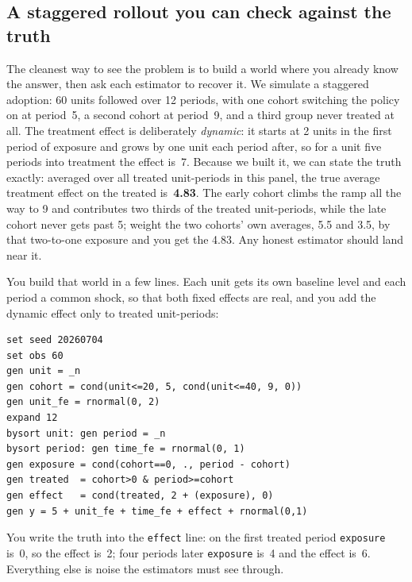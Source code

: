 \documentclass[
    a4paper,
    fontsize=10pt,
    twoside=true,
    numbers=noenddot,
]{kaobook}
\begin{document}
\subsection{A staggered rollout you can check against the truth}
The cleanest way to see the problem is to build a world where you already know the answer, then ask each estimator to recover it. We simulate a staggered adoption: 60 units followed over 12 periods, with one cohort switching the policy on at period~5, a second cohort at period~9, and a third group never treated at all. The treatment effect is deliberately \emph{dynamic}: it starts at 2 units in the first period of exposure and grows by one unit each period after, so for a unit five periods into treatment the effect is~7. Because we built it, we can state the truth exactly: averaged over all treated unit-periods in this panel, the true average treatment effect on the treated is~\textbf{4.83}. The early cohort climbs the ramp all the way to 9 and contributes two thirds of the treated unit-periods, while the late cohort never gets past 5; weight the two cohorts' own averages, 5.5 and 3.5, by that two-to-one exposure and you get the 4.83. Any honest estimator should land near it.

You build that world in a few lines. Each unit gets its own baseline level and each period a common shock, so that both fixed effects are real, and you add the dynamic effect only to treated unit-periods:
\par
{\footnotesize
\begin{verbatim}
set seed 20260704
set obs 60
gen unit = _n
gen cohort = cond(unit<=20, 5, cond(unit<=40, 9, 0))
gen unit_fe = rnormal(0, 2)
expand 12
bysort unit: gen period = _n
bysort period: gen time_fe = rnormal(0, 1)
gen exposure = cond(cohort==0, ., period - cohort)
gen treated  = cohort>0 & period>=cohort
gen effect   = cond(treated, 2 + (exposure), 0)
gen y = 5 + unit_fe + time_fe + effect + rnormal(0,1)
\end{verbatim}
}
You write the truth into the \texttt{effect} line: on the first treated period \texttt{exposure} is~0, so the effect is~2; four periods later \texttt{exposure} is~4 and the effect is~6. Everything else is noise the estimators must see through.
\end{document}
